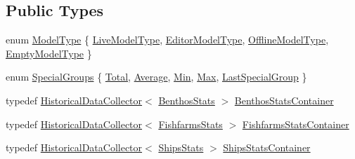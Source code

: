 \subsection*{Public Types}
\begin{DoxyCompactItemize}
\item 
enum \mbox{\hyperlink{class_displace_model_aa89dfe820a935c7ec328dd8fc5c7c8cf}{Model\+Type}} \{ \mbox{\hyperlink{class_displace_model_aa89dfe820a935c7ec328dd8fc5c7c8cfa28c7ce195219066b258b005dc5ba5b81}{Live\+Model\+Type}}, 
\mbox{\hyperlink{class_displace_model_aa89dfe820a935c7ec328dd8fc5c7c8cfa425d27c732d16c259719237b5889d148}{Editor\+Model\+Type}}, 
\mbox{\hyperlink{class_displace_model_aa89dfe820a935c7ec328dd8fc5c7c8cfa6b2616fd09777f9372e7f59da9c6dc71}{Offline\+Model\+Type}}, 
\mbox{\hyperlink{class_displace_model_aa89dfe820a935c7ec328dd8fc5c7c8cfa336d37041631c1408694305c607db962}{Empty\+Model\+Type}}
 \}
\item 
enum \mbox{\hyperlink{class_displace_model_a955fac3bec2cc1c71ee7830f4c2dfe81}{Special\+Groups}} \{ \newline
\mbox{\hyperlink{class_displace_model_a955fac3bec2cc1c71ee7830f4c2dfe81ab179fde031e35ec11238021d5323a0f2}{Total}}, 
\mbox{\hyperlink{class_displace_model_a955fac3bec2cc1c71ee7830f4c2dfe81ad8bfee0cbe36bf3e04025640b1e5ef1a}{Average}}, 
\mbox{\hyperlink{class_displace_model_a955fac3bec2cc1c71ee7830f4c2dfe81a902cd6d23db9fdfe0ab103f1312eeedb}{Min}}, 
\mbox{\hyperlink{class_displace_model_a955fac3bec2cc1c71ee7830f4c2dfe81af7da83d0abaa27c6ed07d7e147a5ca16}{Max}}, 
\newline
\mbox{\hyperlink{class_displace_model_a955fac3bec2cc1c71ee7830f4c2dfe81a7705caca6842e8e5ad2cddc0f40de3c8}{Last\+Special\+Group}}
 \}
\item 
typedef \mbox{\hyperlink{class_historical_data_collector}{Historical\+Data\+Collector}}$<$ \mbox{\hyperlink{class_benthos_stats}{Benthos\+Stats}} $>$ \mbox{\hyperlink{class_displace_model_a58dc0cf9a12cf5a26c28dfdddd3f36ba}{Benthos\+Stats\+Container}}
\item 
typedef \mbox{\hyperlink{class_historical_data_collector}{Historical\+Data\+Collector}}$<$ \mbox{\hyperlink{class_fishfarms_stats}{Fishfarms\+Stats}} $>$ \mbox{\hyperlink{class_displace_model_a79e0e2511f2c59cd7d5e8518ffc8ab17}{Fishfarms\+Stats\+Container}}
\item 
typedef \mbox{\hyperlink{class_historical_data_collector}{Historical\+Data\+Collector}}$<$ \mbox{\hyperlink{class_ships_stats}{Ships\+Stats}} $>$ \mbox{\hyperlink{class_displace_model_a726f3fa27d4963a1cf7a396b26c64a4e}{Ships\+Stats\+Container}}
\end{DoxyCompactItemize}
